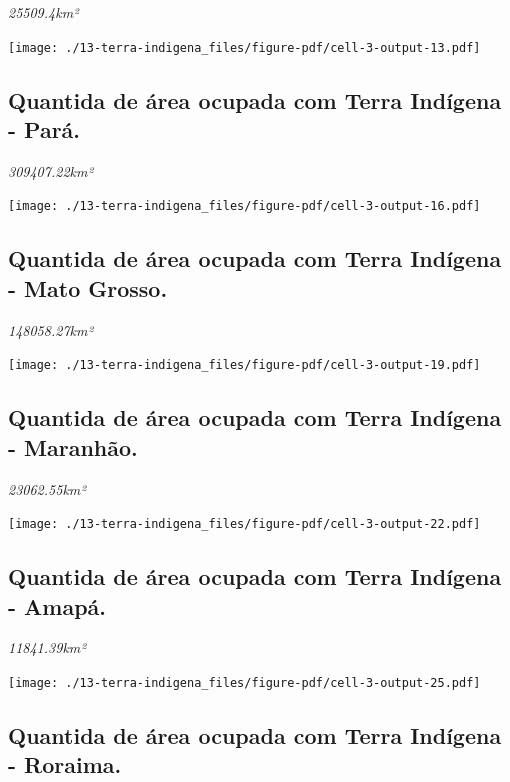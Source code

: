 \documentclass[
  letterpaper,
]{report}
\begin{document}
\emph{25509.4km²}

\texttt{[image: ./13-terra-indigena\_files/figure-pdf/cell-3-output-13.pdf]}

\hypertarget{quantida-de-uxe1rea-ocupada-com-terra-induxedgena---paruxe1.}{%
\subsection{Quantida de área ocupada com Terra Indígena -
Pará.}\label{quantida-de-uxe1rea-ocupada-com-terra-induxedgena---paruxe1.}}

\emph{309407.22km²}

\texttt{[image: ./13-terra-indigena\_files/figure-pdf/cell-3-output-16.pdf]}

\hypertarget{quantida-de-uxe1rea-ocupada-com-terra-induxedgena---mato-grosso.}{%
\subsection{Quantida de área ocupada com Terra Indígena - Mato
Grosso.}\label{quantida-de-uxe1rea-ocupada-com-terra-induxedgena---mato-grosso.}}

\emph{148058.27km²}

\texttt{[image: ./13-terra-indigena\_files/figure-pdf/cell-3-output-19.pdf]}

\hypertarget{quantida-de-uxe1rea-ocupada-com-terra-induxedgena---maranhuxe3o.}{%
\subsection{Quantida de área ocupada com Terra Indígena -
Maranhão.}\label{quantida-de-uxe1rea-ocupada-com-terra-induxedgena---maranhuxe3o.}}

\emph{23062.55km²}

\texttt{[image: ./13-terra-indigena\_files/figure-pdf/cell-3-output-22.pdf]}

\hypertarget{quantida-de-uxe1rea-ocupada-com-terra-induxedgena---amapuxe1.}{%
\subsection{Quantida de área ocupada com Terra Indígena -
Amapá.}\label{quantida-de-uxe1rea-ocupada-com-terra-induxedgena---amapuxe1.}}

\emph{11841.39km²}

\texttt{[image: ./13-terra-indigena\_files/figure-pdf/cell-3-output-25.pdf]}

\hypertarget{quantida-de-uxe1rea-ocupada-com-terra-induxedgena---roraima.}{%
\subsection{Quantida de área ocupada com Terra Indígena -
Roraima.}\label{quantida-de-uxe1rea-ocupada-com-terra-induxedgena---roraima.}}
\end{document}
